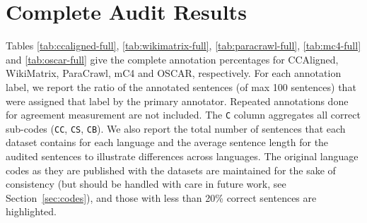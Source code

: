 \section{Complete Audit Results}\label{app:stats}
Tables \ref{tab:ccaligned-full}, \ref{tab:wikimatrix-full}, \ref{tab:paracrawl-full}, \ref{tab:mc4-full} and \ref{tab:oscar-full} give the complete annotation percentages for CCAligned, WikiMatrix, ParaCrawl, mC4 and OSCAR, respectively. For each annotation label, we report the ratio of the annotated sentences (of max 100 sentences) that were assigned that label by the primary annotator. Repeated annotations done for agreement measurement are not included. The \texttt{C} column aggregates all correct sub-codes (\texttt{CC}, \texttt{CS}, \texttt{CB}). We also report the total number of sentences that each dataset contains for each language and the average sentence length for the audited sentences to illustrate differences across languages. The original language codes as they are published with the datasets are maintained for the sake of consistency (but should be handled with care in future work, see Section~\ref{sec:codes}), and those with less than 20\% correct sentences are highlighted.


